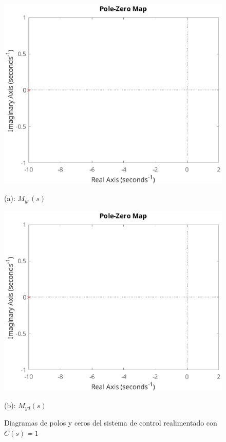 \begin{figure}[!h]
    \centering
    \begin{minipage}{0.45\linewidth}
        \includegraphics[width=\linewidth]{figs/fig8.eps}
        \caption*{(a): $M_{yr}(s)$}
    \end{minipage}
    \begin{minipage}{0.45\linewidth}
        \includegraphics[width=\linewidth]{figs/fig9.eps}
        \caption*{(b): $M _{yd}(s)$}
    \end{minipage}
    \caption{Diagramas de polos y ceros del sistema de control realimentado con $C(s) = 1$}
    \label{fig6}
\end{figure}

